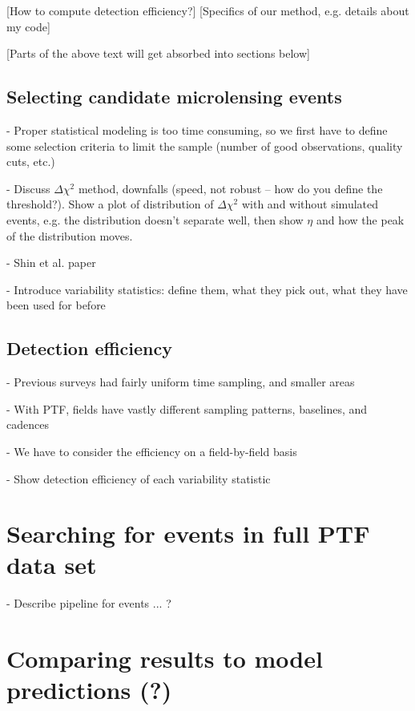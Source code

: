 \documentclass[12pt,preprint]{aastex}
\begin{document}

[How to compute detection efficiency?] [Specifics of our method, e.g. details about my code]

[Parts of the above text will get absorbed into sections below]

\subsection{Selecting candidate microlensing events}
- Proper statistical modeling is too time consuming, so we first have to define some selection criteria to limit the sample (number of good observations, quality cuts, etc.)

- Discuss $\Delta \chi^2$ method, downfalls (speed, not robust -- how do you define the threshold?). Show a plot of distribution of $\Delta \chi^2$ with and without simulated events, e.g. the distribution doesn't separate well, then show $\eta$ and how the peak of the distribution moves.

- Shin et al. paper

- Introduce variability statistics: define them, what they pick out, what they have been used for before

\subsection{Detection efficiency}
- Previous surveys had fairly uniform time sampling, and smaller areas

- With PTF, fields have vastly different sampling patterns, baselines, and cadences

- We have to consider the efficiency on a field-by-field basis

- Show detection efficiency of each variability statistic

\section{Searching for events in full PTF data set}
- Describe pipeline for events ... ?

\section{Comparing results to model predictions (?)}
\end{document}
